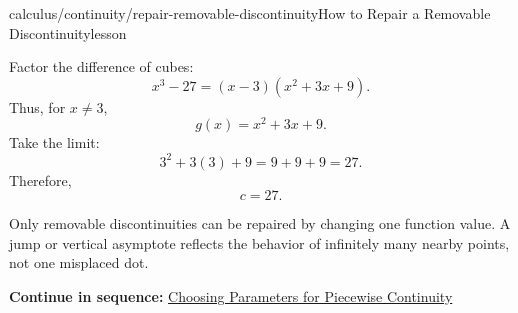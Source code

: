 \documentclass[11pt,openany]{book}
\theoremstyle{bgplain}
\newcounter{bgexample}[chapter]
\newcommand{\webnext}[2]{%
  \par\addvspace{1.2em}\noindent{\color{BGLine}\rule{\textwidth}{0.35pt}}\par\smallskip
  {\small\color{BGGray}\textbf{Continue in sequence:} \hyperlink{web:#1}{#2}}\par
}
\begin{document}
\begin{webpage}{calculus/continuity/repair-removable-discontinuity}{How to Repair a Removable Discontinuity}{lesson}
\begin{bgexample}[title={Repair a more complicated hole}]
\begin{bgsolution}
Factor the difference of cubes:
\[
  x^3-27=(x-3)(x^2+3x+9).
\]
Thus, for \(x\ne3\),
\[
  g(x)=x^2+3x+9.
\]
Take the limit:
\[
  3^2+3(3)+9=9+9+9=27.
\]
Therefore,
\[
  \boxed{c=27}.
\]
\end{bgsolution}
\end{bgexample}

\begin{bgmistake}
Only removable discontinuities can be repaired by changing one function value. A jump or vertical asymptote reflects the behavior of infinitely many nearby points, not one misplaced dot.
\end{bgmistake}
\webnext{calculus/continuity/piecewise-parameters}{Choosing Parameters for Piecewise Continuity}
\end{webpage}
\end{document}

